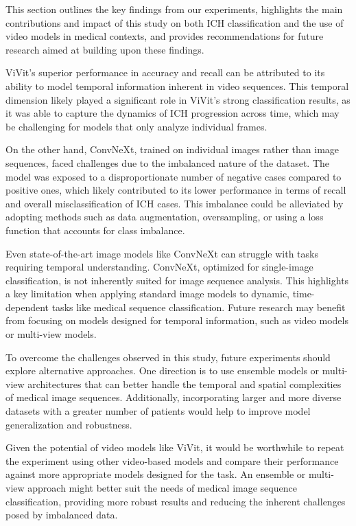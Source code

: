 This section outlines the key findings from our experiments, highlights the main contributions and impact of this study on both ICH classification and the use of video models in medical contexts, and provides recommendations for future research aimed at building upon these findings.

ViVit's superior performance in accuracy and recall can be attributed to its ability to model temporal information inherent in video sequences. This temporal dimension likely played a significant role in ViVit's strong classification results, as it was able to capture the dynamics of ICH progression across time, which may be challenging for models that only analyze individual frames.

On the other hand, ConvNeXt, trained on individual images rather than image sequences, faced challenges due to the imbalanced nature of the dataset. The model was exposed to a disproportionate number of negative cases compared to positive ones, which likely contributed to its lower performance in terms of recall and overall misclassification of ICH cases. This imbalance could be alleviated by adopting methods such as data augmentation, oversampling, or using a loss function that accounts for class imbalance.

Even state-of-the-art image models like ConvNeXt can struggle with tasks requiring temporal understanding. ConvNeXt, optimized for single-image classification, is not inherently suited for image sequence analysis. This highlights a key limitation when applying standard image models to dynamic, time-dependent tasks like medical sequence classification. Future research may benefit from focusing on models designed for temporal information, such as video models or multi-view models.

To overcome the challenges observed in this study, future experiments should explore alternative approaches. One direction is to use ensemble models or multi-view architectures that can better handle the temporal and spatial complexities of medical image sequences. Additionally, incorporating larger and more diverse datasets with a greater number of patients would help to improve model generalization and robustness.

Given the potential of video models like ViVit, it would be worthwhile to repeat the experiment using other video-based models and compare their performance against more appropriate models designed for the task. An ensemble or multi-view approach might better suit the needs of medical image sequence classification, providing more robust results and reducing the inherent challenges posed by imbalanced data.

